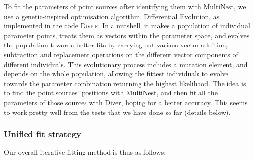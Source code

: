 \documentclass{article}
\begin{document}
To fit the parameters of point sources after identifying them with MultiNest, we use a genetic-inspired optimisation algorithm, Differential Evolution, as implemented in the code \textsc{Diver}. In a nutshell, it makes a population of individual parameter points, treats them as vectors within the parameter space, and evolves the population towards better fits by carrying out various vector addition, subtraction and replacement operations on the different vector components of different individuals.  This evolutionary process includes a mutation element, and depends on the whole population, allowing the fittest individuals to evolve towards the parameter combination returning the highest likelihood. The idea is to find the point sources' positions with MultiNest, and then fit all the parameters of those sources with Diver, hoping for a better accuracy.  This seems to work pretty well from the tests that we have done so far (details below).

\subsubsection{Unified fit strategy}
\label{UFS}

Our overall iterative fitting method is thus as follows:
\end{document}
